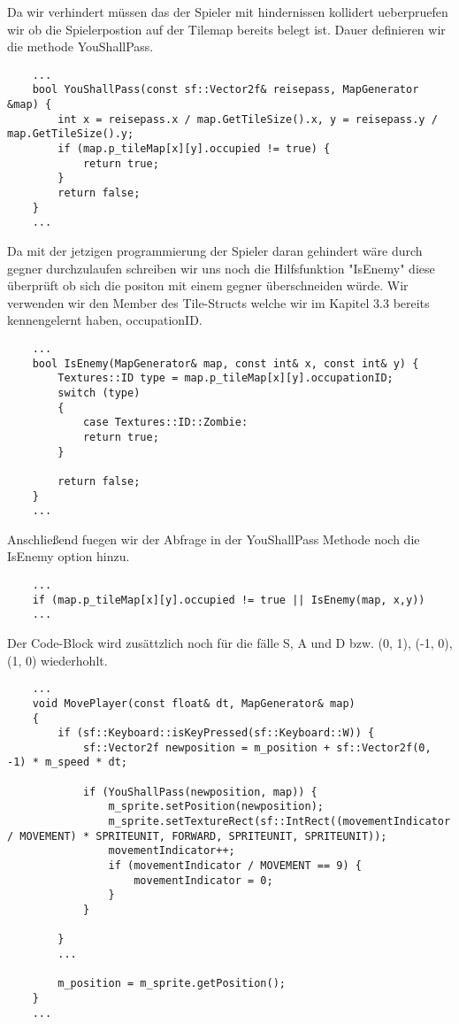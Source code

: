Da wir verhindert müssen das der Spieler mit hindernissen kollidert ueberpruefen wir ob die Spielerpostion auf der Tilemap bereits belegt ist. Dauer definieren wir die
methode YouShallPass.

\begin{lstlisting}
	...
	bool YouShallPass(const sf::Vector2f& reisepass, MapGenerator &map) {
		int x = reisepass.x / map.GetTileSize().x, y = reisepass.y / map.GetTileSize().y; 
		if (map.p_tileMap[x][y].occupied != true) {
			return true; 
		}
		return false; 
	}
	...
\end{lstlisting}

Da mit der jetzigen programmierung der Spieler daran gehindert wäre durch gegner durchzulaufen schreiben wir uns noch die Hilfsfunktion "IsEnemy" diese überprüft ob sich die positon mit einem gegner überschneiden würde. Wir verwenden wir den Member des Tile-Structs welche wir im Kapitel 3.3 bereits kennengelernt haben, occupationID. 

\begin{lstlisting}
	...
	bool IsEnemy(MapGenerator& map, const int& x, const int& y) {
		Textures::ID type = map.p_tileMap[x][y].occupationID; 
		switch (type)
		{
			case Textures::ID::Zombie:
			return true; 
		}
		
		return false; 
	}
	...
\end{lstlisting}

Anschließend fuegen wir der Abfrage in der YouShallPass Methode noch die IsEnemy option hinzu.

\begin{lstlisting}
	...
    if (map.p_tileMap[x][y].occupied != true || IsEnemy(map, x,y)) 
	...
\end{lstlisting}

Der Code-Block wird zusättzlich noch für die fälle S, A und D bzw. (0, 1), (-1, 0), (1, 0) wiederhohlt.  

\begin{lstlisting}
	...
	void MovePlayer(const float& dt, MapGenerator& map)
	{
		if (sf::Keyboard::isKeyPressed(sf::Keyboard::W)) {
			sf::Vector2f newposition = m_position + sf::Vector2f(0, -1) * m_speed * dt; 
			
			if (YouShallPass(newposition, map)) {
				m_sprite.setPosition(newposition);
				m_sprite.setTextureRect(sf::IntRect((movementIndicator / MOVEMENT) * SPRITEUNIT, FORWARD, SPRITEUNIT, SPRITEUNIT));
				movementIndicator++;
				if (movementIndicator / MOVEMENT == 9) {
					movementIndicator = 0;
				}
			}
			
		}
		...
		
		m_position = m_sprite.getPosition();
	}
	...
\end{lstlisting}




